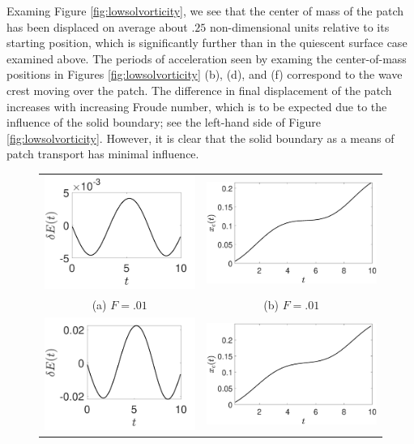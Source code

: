 \documentclass[a4paper,11pt]{article}
\begin{document}
Examing Figure \ref{fig:lowsolvorticity}, we see that the center of mass of the patch has been displaced on average about $.25$ non-dimensional units relative to its starting position, which is significantly further than in the quiescent surface case examined above.  The periods of acceleration seen by examing the center-of-mass positions in Figures \ref{fig:lowsolvorticity} (b), (d), and (f) correspond to the wave crest moving over the patch.  The difference in final displacement of the patch increases with increasing Froude number, which is to be expected due to the influence of the solid boundary; see the left-hand side of Figure \ref{fig:lowsolvorticity}.  However, it is clear that the solid boundary as a means of patch transport has minimal influence.
\begin{figure}
\centering
\begin{tabular}{cc}
\includegraphics[width=.35\textwidth]{energy_wm_1_modu_pt3} &  \includegraphics[width=.35\textwidth]{com_wm_1_modu_pt3}\\
(a) $F=.01$ & (b) $F=.01$\\
\includegraphics[width=.35\textwidth]{energy_wm_5_modu_pt3} & \includegraphics[width=.35\textwidth]{com_wm_5_modu_pt3}\\

\end{tabular}
\end{figure}
\end{document}
